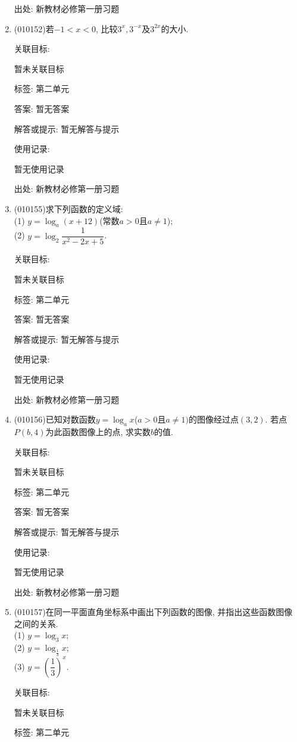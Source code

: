 \documentclass[10pt,a4paper]{article}
\begin{document}
\begin{enumerate}[1.]
出处: 新教材必修第一册习题
\item { (010152)}若$-1<x<0$, 比较$3^x, 3^{-x}$及$3^{2x}$的大小.


关联目标:

暂未关联目标



标签: 第二单元

答案: 暂无答案

解答或提示: 暂无解答与提示

使用记录:

暂无使用记录


出处: 新教材必修第一册习题
\item { (010155)}求下列函数的定义域:\\
(1) $y=\log_a (x+12)$(常数$a>0$且$a\ne 1$);\\
(2) $y=\log_2\dfrac1{x^2-2x+5}$.


关联目标:

暂未关联目标



标签: 第二单元

答案: 暂无答案

解答或提示: 暂无解答与提示

使用记录:

暂无使用记录


出处: 新教材必修第一册习题
\item { (010156)}已知对数函数$y=\log_ax$($a>0$且$a\ne 1)$的图像经过点$(3, 2)$. 若点$P(b, 4)$为此函数图像上的点, 求实数$b$的值.


关联目标:

暂未关联目标



标签: 第二单元

答案: 暂无答案

解答或提示: 暂无解答与提示

使用记录:

暂无使用记录


出处: 新教材必修第一册习题
\item { (010157)}在同一平面直角坐标系中画出下列函数的图像, 并指出这些函数图像之间的关系.\\
(1) $y=\log_3x$;\\
(2) $y=\log_{\frac 13}x$;\\
(3) $y=(\dfrac 13)^x$.


关联目标:

暂未关联目标



标签: 第二单元


\end{enumerate}
\end{document}
